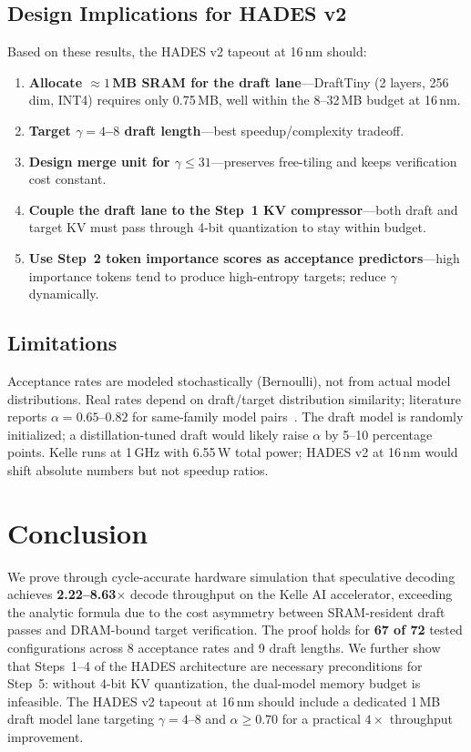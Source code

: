 \documentclass[conference]{IEEEtran}
\begin{document}
\subsection{Design Implications for HADES v2}

Based on these results, the HADES v2 tapeout at 16\,nm should:
\begin{enumerate}
  \item \textbf{Allocate ${\approx}1$\,MB SRAM for the draft lane}---DraftTiny
        (2 layers, 256 dim, INT4) requires only 0.75\,MB, well within the
        8--32\,MB budget at 16\,nm.
  \item \textbf{Target $\gamma = 4$--$8$ draft length}---best speedup/complexity
        tradeoff.
  \item \textbf{Design merge unit for $\gamma \le 31$}---preserves free-tiling and
        keeps verification cost constant.
  \item \textbf{Couple the draft lane to the Step~1 KV compressor}---both draft and
        target KV must pass through 4-bit quantization to stay within budget.
  \item \textbf{Use Step~2 token importance scores as acceptance predictors}---high
        importance tokens tend to produce high-entropy targets; reduce $\gamma$
        dynamically.
\end{enumerate}

\subsection{Limitations}

Acceptance rates are modeled stochastically (Bernoulli), not from actual model
distributions.
Real rates depend on draft/target distribution similarity; literature reports
$\alpha = 0.65$--$0.82$ for same-family model pairs~\cite{leviathan2023,chen2023}.
The draft model is randomly initialized; a distillation-tuned draft would likely
raise $\alpha$ by 5--10 percentage points.
Kelle runs at 1\,GHz with 6.55\,W total power; HADES v2 at 16\,nm would shift
absolute numbers but not speedup ratios.

\section{Conclusion}

We prove through cycle-accurate hardware simulation that speculative decoding
achieves \textbf{2.22--8.63$\times$} decode throughput on the Kelle AI
accelerator, exceeding the analytic formula due to the cost asymmetry between
SRAM-resident draft passes and DRAM-bound target verification.
The proof holds for \textbf{67 of 72} tested configurations across 8 acceptance
rates and 9 draft lengths.
We further show that Steps~1--4 of the HADES architecture are necessary
preconditions for Step~5: without 4-bit KV quantization, the dual-model memory
budget is infeasible.
The HADES v2 tapeout at 16\,nm should include a dedicated 1\,MB draft model
lane targeting $\gamma = 4$--$8$ and $\alpha \ge 0.70$ for a practical
$4\times$ throughput improvement.
\end{document}
